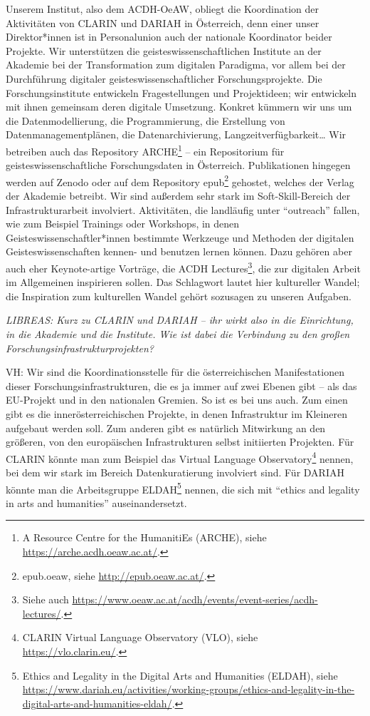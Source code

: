 \documentclass[a4paper,
fontsize=11pt,
oneside,
numbers=noperiodatend,
parskip=half-,
bibliography=totoc,
final
]{scrartcl}
\begin{document}
Unserem Institut, also dem ACDH-OeAW, obliegt die Koordination der
Aktivitäten von CLARIN und DARIAH in Österreich, denn einer unser
Direktor*innen ist in Personalunion auch der nationale Koordinator
beider Projekte. Wir unterstützen die geisteswissenschaftlichen
Institute an der Akademie bei der Transformation zum digitalen
Paradigma, vor allem bei der Durchführung digitaler
geisteswissenschaftlicher Forschungsprojekte. Die Forschungsinstitute
entwickeln Fragestellungen und Projektideen; wir entwickeln mit ihnen
gemeinsam deren digitale Umsetzung. Konkret kümmern wir uns um die
Datenmodellierung, die Programmierung, die Erstellung von
Datenmanagementplänen, die Datenarchivierung,
Langzeitverfügbarkeit\ldots{} Wir betreiben auch das Repository
ARCHE\footnote{A Resource Centre for the HumanitiEs (ARCHE), siehe
  \url{https://arche.acdh.oeaw.ac.at/}.} -- ein Repositorium für
geisteswissenschaftliche Forschungsdaten in Österreich. Publikationen
hingegen werden auf Zenodo oder auf dem Repository epub\footnote{epub.oeaw,
  siehe \url{http://epub.oeaw.ac.at/}.} gehostet, welches der Verlag der
Akademie betreibt. Wir sind außerdem sehr stark im Soft-Skill-Bereich
der Infrastrukturarbeit involviert. Aktivitäten, die landläufig unter
\enquote{outreach} fallen, wie zum Beispiel Trainings oder Workshops, in denen
Geisteswissenschaftler*innen bestimmte Werkzeuge und Methoden der
digitalen Geisteswissenschaften kennen- und benutzen lernen können. Dazu
gehören aber auch eher Keynote-artige Vorträge, die ACDH
Lectures\footnote{Siehe auch
  \url{https://www.oeaw.ac.at/acdh/events/event-series/acdh-lectures/}.},
die zur digitalen Arbeit im Allgemeinen inspirieren sollen. Das
Schlagwort lautet hier kultureller Wandel; die Inspiration zum
kulturellen Wandel gehört sozusagen zu unseren Aufgaben.

\emph{LIBREAS: Kurz zu CLARIN und DARIAH -- ihr wirkt also in die
Einrichtung, in die Akademie und die Institute. Wie ist dabei die
Verbindung zu den großen Forschungsinfrastrukturprojekten?}

VH: Wir sind die Koordinationsstelle für die österreichischen
Manifestationen dieser Forschungsinfrastrukturen, die es ja immer auf
zwei Ebenen gibt -- als das EU-Projekt und in den nationalen Gremien. So
ist es bei uns auch. Zum einen gibt es die innerösterreichischen
Projekte, in denen Infrastruktur im Kleineren aufgebaut werden soll. Zum
anderen gibt es natürlich Mitwirkung an den größeren, von den
europäischen Infrastrukturen selbst initiierten Projekten. Für CLARIN
könnte man zum Beispiel das Virtual Language Observatory\footnote{CLARIN
  Virtual Language Observatory (VLO), siehe
  \url{https://vlo.clarin.eu/}.} nennen, bei dem wir stark im Bereich
Datenkuratierung involviert sind. Für DARIAH könnte man die
Arbeitsgruppe ELDAH\footnote{Ethics and Legality in the Digital Arts and
  Humanities (ELDAH), siehe
  \url{https://www.dariah.eu/activities/working-groups/ethics-and-legality-in-the-digital-arts-and-humanities-eldah/}.}
nennen, die sich mit \enquote{ethics and legality in arts and humanities}
auseinandersetzt.
\end{document}
